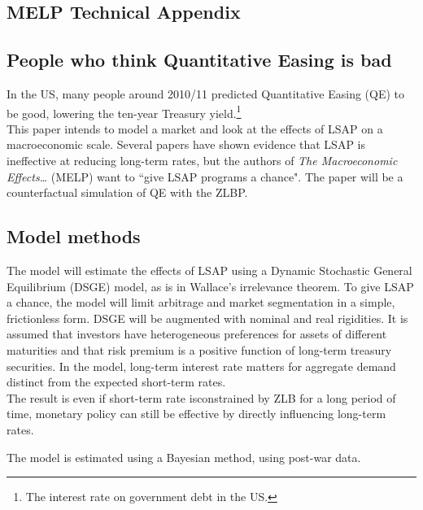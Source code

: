 \documentclass[notitlepage,12pt]{report}
\begin{document}
\begin{appendices}
	\chapter{MELP Technical Appendix}
	
	\section{People who think Quantitative Easing is bad}
	
	In the US, many people around 2010/11 predicted Quantitative Easing (QE) to be good, lowering the ten-year Treasury yield.\footnote{The interest rate on government debt in the US.}\cite{krishnamurthy_effects_2011,neely_large-scale_2012,damico_flow_2011,doh_efficacy_2010,hamilton_effectiveness_2011,gagnon_large-scale_2011}\\
	This paper intends to model a market and look at the effects of LSAP on a macroeconomic scale. Several papers have shown evidence that LSAP is ineffective at reducing long-term rates\cite[Table 1, p.42]{chen_macroeconomic_2011}, but the authors of {\it The Macroeconomic Effects\dots} (MELP) want to ``give LSAP programs a chance".\cite[p.2]{chen_macroeconomic_2011} The paper will be a counterfactual simulation of QE with the ZLBP.
	
	\section{Model methods}
	
	The model will estimate the effects of LSAP using a Dynamic Stochastic General Equilibrium (DSGE) model, as is in Wallace's irrelevance theorem.\cite{wallace_modigliani-miller_1981} To give LSAP a chance, the model will limit arbitrage and market segmentation in a simple, frictionless form. DSGE will be augmented with nominal and real rigidities. It is assumed that investors have heterogeneous preferences for assets of different maturities and that risk premium is a positive function of long-term treasury securities. In the model, long-term interest rate matters for aggregate demand distinct from the expected short-term rates.\\
	The result is even if short-term rate isconstrained by ZLB for a long period of time, monetary policy can still be effective by directly influencing long-term rates.
	
	The model is estimated using a Bayesian method, using post-war data.
	

\end{appendices}
\end{document}
